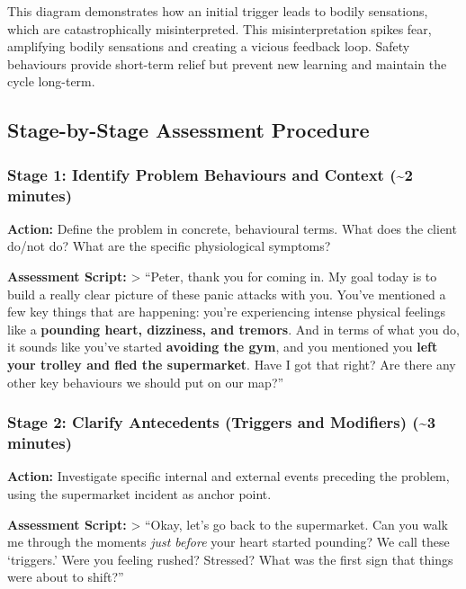 \documentclass[
  american,
  11pt,
  11pt,
  letterpaper,
  onecolumn]{article}
\begin{document}
This diagram demonstrates how an initial trigger leads to bodily
sensations, which are catastrophically misinterpreted. This
misinterpretation spikes fear, amplifying bodily sensations and creating
a vicious feedback loop. Safety behaviours provide short-term relief but
prevent new learning and maintain the cycle long-term.

\subsection{Stage-by-Stage Assessment
Procedure}\label{stage-by-stage-assessment-procedure}

\subsubsection{Stage 1: Identify Problem Behaviours and Context
(\textasciitilde2
minutes)}\label{stage-1-identify-problem-behaviours-and-context-2-minutes}

\textbf{Action:} Define the problem in concrete, behavioural terms. What
does the client do/not do? What are the specific physiological symptoms?

\textbf{Assessment Script:} \textgreater{} ``Peter, thank you for coming
in. My goal today is to build a really clear picture of these panic
attacks with you. You've mentioned a few key things that are happening:
you're experiencing intense physical feelings like a \textbf{pounding
heart, dizziness, and tremors}. And in terms of what you do, it sounds
like you've started \textbf{avoiding the gym}, and you mentioned you
\textbf{left your trolley and fled the supermarket}. Have I got that
right? Are there any other key behaviours we should put on our map?''

\subsubsection{Stage 2: Clarify Antecedents (Triggers and Modifiers)
(\textasciitilde3
minutes)}\label{stage-2-clarify-antecedents-triggers-and-modifiers-3-minutes}

\textbf{Action:} Investigate specific internal and external events
preceding the problem, using the supermarket incident as anchor point.

\textbf{Assessment Script:} \textgreater{} ``Okay, let's go back to the
supermarket. Can you walk me through the moments \emph{just before} your
heart started pounding? We call these `triggers.' Were you feeling
rushed? Stressed? What was the first sign that things were about to
shift?''
\end{document}
